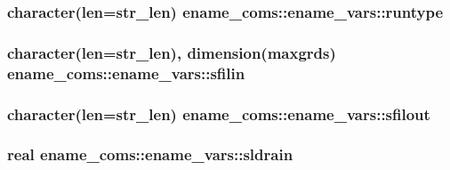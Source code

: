 \subsubsection[{\texorpdfstring{runtype}{runtype}}]{\setlength{\rightskip}{0pt plus 5cm}character(len=str\+\_\+len) ename\+\_\+coms\+::ename\+\_\+vars\+::runtype}\hypertarget{structename__coms_1_1ename__vars_ac621d47b49d6ebf3a550bde26b79cb7a}{}\label{structename__coms_1_1ename__vars_ac621d47b49d6ebf3a550bde26b79cb7a}
\subsubsection[{\texorpdfstring{sfilin}{sfilin}}]{\setlength{\rightskip}{0pt plus 5cm}character(len=str\+\_\+len), dimension(maxgrds) ename\+\_\+coms\+::ename\+\_\+vars\+::sfilin}\hypertarget{structename__coms_1_1ename__vars_a0b29a735224c75012629c5b99e08dad6}{}\label{structename__coms_1_1ename__vars_a0b29a735224c75012629c5b99e08dad6}
\subsubsection[{\texorpdfstring{sfilout}{sfilout}}]{\setlength{\rightskip}{0pt plus 5cm}character(len=str\+\_\+len) ename\+\_\+coms\+::ename\+\_\+vars\+::sfilout}\hypertarget{structename__coms_1_1ename__vars_a88267d1c2a655cba72220200c9309fec}{}\label{structename__coms_1_1ename__vars_a88267d1c2a655cba72220200c9309fec}
\subsubsection[{\texorpdfstring{sldrain}{sldrain}}]{\setlength{\rightskip}{0pt plus 5cm}real ename\+\_\+coms\+::ename\+\_\+vars\+::sldrain}\hypertarget{structename__coms_1_1ename__vars_ad009cf792cd522fa579bc576db307ddd}{}\label{structename__coms_1_1ename__vars_ad009cf792cd522fa579bc576db307ddd}

